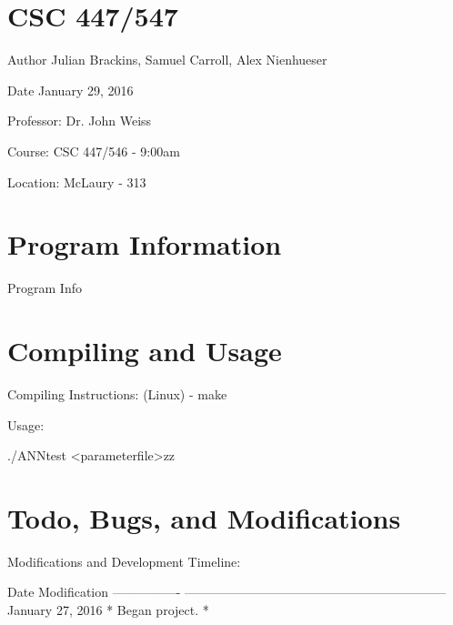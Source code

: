 \hypertarget{index_course_section}{}\section{C\-S\-C 447/547}\label{index_course_section}
\begin{DoxyAuthor}{Author}
Julian Brackins, Samuel Carroll, Alex Nienhueser
\end{DoxyAuthor}
\begin{DoxyDate}{Date}
January 29, 2016
\end{DoxyDate}
\begin{DoxyParagraph}{Professor\-:}
Dr. John Weiss
\end{DoxyParagraph}
\begin{DoxyParagraph}{Course\-:}
C\-S\-C 447/546 -\/ 9\-:00am
\end{DoxyParagraph}
\begin{DoxyParagraph}{Location\-:}
Mc\-Laury -\/ 313
\end{DoxyParagraph}
\hypertarget{index_program_section}{}\section{Program Information}\label{index_program_section}
Program Info\hypertarget{index_compile_section}{}\section{Compiling and Usage}\label{index_compile_section}
\begin{DoxyParagraph}{Compiling Instructions\-:}
(Linux) -\/ make
\end{DoxyParagraph}
\begin{DoxyParagraph}{Usage\-:}
\begin{DoxyVerb}./ANNtest <parameterfile>zz
\end{DoxyVerb}

\end{DoxyParagraph}
\hypertarget{index_todo_bugs_modification_section}{}\section{Todo, Bugs, and Modifications}\label{index_todo_bugs_modification_section}
\begin{DoxyParagraph}{Modifications and Development Timeline\-:}
\begin{DoxyVerb}Date              Modification
----------------  --------------------------------------------------------------
January 27, 2016  * Began project.
* 
\end{DoxyVerb}
 
\end{DoxyParagraph}
